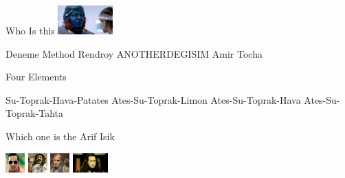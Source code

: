 \documentclass{exam}
\begin{document}
\begin{questions}
\question Who Is this\newline
\includegraphics[height=3em]{rendroy2.jpg} \newline
\begin{oneparchoices}
\choice Deneme Method
\choice Rendroy
\choice ANOTHERDEGISIM
\choice Amir Tocha
\end{oneparchoices}
\question Four Elements\newline
\begin{oneparchoices}
\choice Su-Toprak-Hava-Patates
\choice Ates-Su-Toprak-Limon
\choice Ates-Su-Toprak-Hava
\choice Ates-Su-Toprak-Tahta
\end{oneparchoices}
\question Which one is the Arif Isik\newline
\begin{oneparchoices}
\choice \includegraphics[height=2em]{arifisik.jpg}
\choice \includegraphics[height=2em]{faruk.jpg}
\choice \includegraphics[height=2em]{216.jpg}
\choice \includegraphics[height=2em]{komutanlogar.jpeg}
\end{oneparchoices}
\end{questions}
\end{document}

